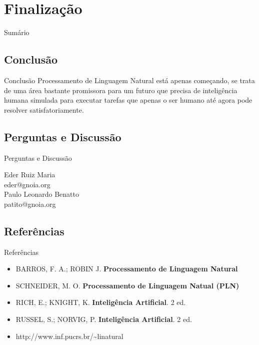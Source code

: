 \renewcommand{\titulo}{Finalização}
\section{\titulo}

\begin{frame}{Sumário}
\tableofcontents[currentsection]
\end{frame}

\renewcommand{\titulo}{Conclusão}
\subsection{\titulo}
\begin{frame}{\titulo}
Processamento de Linguagem Natural está apenas começando, se trata de uma área bastante promissora para um futuro que precisa de inteligência humana simulada para executar tarefas que	apenas o ser humano até agora pode resolver satisfatoriamente.
\end{frame}

\renewcommand{\titulo}{Perguntas e Discussão}
\subsection{\titulo}
\begin{frame}{\titulo}
\begin{center}
Eder Ruiz Maria \\
eder@gnoia.org \\
\vspace{0.5cm}
Paulo Leonardo Benatto \\
patito@gnoia.org
\end{center}
\end{frame}

\renewcommand{\titulo}{Referências}
\subsection{\titulo}
\begin{frame}{\titulo}
\begin{itemize}
\item BARROS, F. A.; ROBIN J. \textbf{Processamento de Linguagem Natural}
\item SCHNEIDER, M. O. \textbf{Processamento de Linguagem Natual (PLN)}
\item RICH, E.; KNIGHT, K. \textbf{Inteligência Artificial}. 2 ed.
\item RUSSEL, S.; NORVIG, P. \textbf{Inteligência Artificial}. 2 ed.
\item http://www.inf.pucrs.br/\~{}linatural
\end{itemize}
\end{frame}


